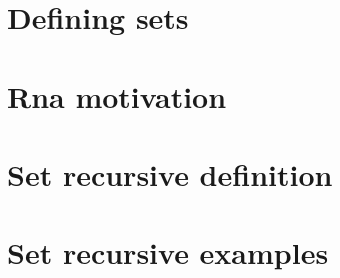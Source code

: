
\section*{Defining sets}

\vfill
\section*{Rna motivation}

\vfill
\section*{Set recursive definition}

\vfill
\section*{Set recursive examples}

\vfill
